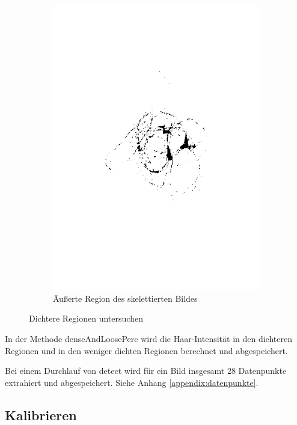 \documentclass[german,a4paper, 12pt]{llncs}
\begin{document}
\begin{figure}
\begin{subfigure}[b]{0.475\textwidth}
		\includegraphics[width=\textwidth]{fig64/09outer section.png}
		\caption[]{Äußerte Region des skelettierten Bildes}
		\label{img:skelBGregion}
	\end{subfigure}
	\caption[  ]
	{\small Dichtere Regionen untersuchen} 
	\label{img:skelwarp}
\end{figure}

In der Methode denseAndLoosePerc wird die Haar-Intensität in den dichteren Regionen und in den weniger dichten Regionen berechnet und abgespeichert.

Bei einem Durchlauf von detect wird für ein Bild insgesamt 28 Datenpunkte extrahiert und abgespeichert. Siehe Anhang \ref{appendix:datenpunkte}. 



\subsection{Kalibrieren}
\end{document}
